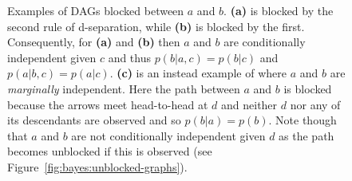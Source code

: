 \begin{figure}[t]
	\centering 
	\begin{subfigure}[t]{0.32\textwidth}
		\centering
		\resizebox{0.9\textwidth}{!}{
		}
		\caption{\label{fig:bayes:block1}}
	\end{subfigure}
	\begin{subfigure}[t]{0.32\textwidth}
		\centering
		\resizebox{0.9\textwidth}{!}{
		}
		\caption{\label{fig:bayes:block2}}
	\end{subfigure}
	\begin{subfigure}[t]{0.32\textwidth}
		\centering
		\resizebox{0.9\textwidth}{!}{
		}
		\caption{\label{fig:bayes:block3}}
	\end{subfigure}
	\caption{Examples of DAGs blocked between $a$ and $b$.  \textbf{(a)} is blocked
		by the second rule of d-separation, while
		\textbf{(b)} is blocked by the first.  Consequently, for \textbf{(a)} 
		and \textbf{(b)} then $a$ and $b$ are conditionally independent given $c$ and thus
		$p(b|a,c)=p(b|c)$ and $p(a|b,c)=p(a|c)$.
		\textbf{(c)} is an instead example of where $a$ and $b$ are \emph{marginally} independent.  Here
		the path between $a$ and $b$ is blocked because the arrows meet head-to-head at 
		$d$ and neither $d$ nor any of its
		descendants are observed and so $p(b|a) = p(b)$.
		Note though that $a$ and $b$ are not conditionally independent given $d$ as
		the path becomes unblocked if this is observed (see Figure~\ref{fig:bayes:unblocked-graphs}).
		\label{fig:bayes:blocked-graphs}
		\vspace{5pt}}
\end{figure}

